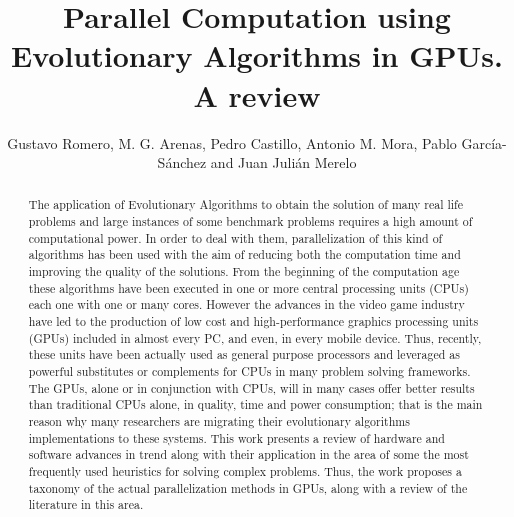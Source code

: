 \documentclass[Afour,sageh,times]{sagej}
\begin{document}

\title{Parallel Computation using Evolutionary Algorithms in GPUs. A review} %

\author{Gustavo Romero, M. G. Arenas, Pedro Castillo, Antonio M. Mora, Pablo Garc\'ia-S\'anchez and Juan Juli\'an Merelo}





\begin{abstract}
The application of Evolutionary Algorithms to obtain the solution of many real life problems and large instances of some
benchmark problems requires a high amount of computational power. In order
to deal with them, parallelization of this kind of algorithms has been used with
the aim of reducing both the computation time and improving the
quality of the solutions. From the beginning of the computation age
these algorithms have been executed in one or more central processing units
(CPUs) each one with one or many cores. However the advances in the video game industry have led to the production of low cost and high-performance graphics processing units (GPUs) included in almost every PC, and even, in every mobile
device. Thus, recently, these units have been actually used as general
purpose processors and leveraged as powerful substitutes or complements for CPUs in many problem solving frameworks.
The GPUs, alone or in conjunction with CPUs, will in many cases offer better results than traditional CPUs alone, in quality, time and power consumption; that
is the main reason why many researchers are migrating their evolutionary algorithms implementations to these systems. This work presents a review of hardware and software advances in trend 
along with their application in the area of some the most frequently
used heuristics for solving complex problems. Thus, the work proposes a taxonomy of the actual parallelization methods in GPUs, along with a review of the literature in this area.
\end{abstract}
\end{document}
